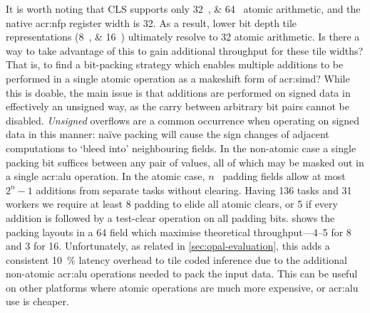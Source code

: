It is worth noting that CLS supports only \qtylist{32;64}{\bit} atomic arithmetic, and the native \gls{acr:nfp} register width is \qty{32}{\bit}.
As a result, lower bit depth tile representations (\qtylist{8;16}{\bit}) ultimately resolve to \qty{32}{\bit} atomic arithmetic.
Is there a way to take advantage of this to gain additional throughput for these tile widths?
That is, to find a bit-packing strategy which enables multiple additions to be performed in a single atomic operation as a makeshift form of \gls{acr:simd}?
While this is doable, the main issue is that additions are performed on signed data in effectively an unsigned way, as the carry between arbitrary bit pairs cannot be disabled.
\emph{Unsigned} overflows are a common occurrence when operating on signed data in this manner: na\"{i}ve packing will cause the sign changes of adjacent computations to `bleed into' neighbouring fields.
In the non-atomic case a single packing bit suffices between any pair of values, all of which may be masked out in a single \gls{acr:alu} operation.
In the atomic case, $n$~\unit{\bit} padding fields allow at most $2^n-1$ additions from separate tasks without clearing.
Having \num{136} tasks and \num{31} workers we require at least \qty{8}{\bit} padding to elide all atomic clears, or \qty{5}{\bit} if every addition is followed by a test-clear operation on all padding bits.
 shows the packing layouts in a \qty{64}{\bit} field which maximise theoretical throughput---\qtyrange{4}{5}{\times} for \qty{8}{\bit} and \qty{3}{\times} for \qty{16}{\bit}.
Unfortunately, as related in \cref{sec:opal-evaluation}, this adds a consistent \qty{10}{\percent} latency overhead to tile coded inference due to the additional non-atomic \gls{acr:alu} operations needed to pack the input data.
This can be useful on other platforms where atomic operations are much more expensive, or \gls{acr:alu} use is cheaper.

